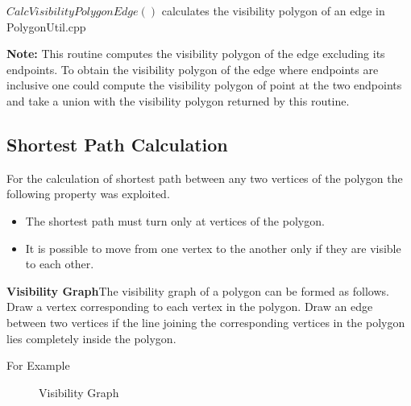  $CalcVisibilityPolygonEdge()$ calculates the visibility polygon of an edge in PolygonUtil.cpp

{\bf Note:}
This routine computes the visibility polygon of the edge excluding its endpoints. To obtain the visibility polygon of the edge where
endpoints are inclusive one could compute the visibility polygon of point at the two endpoints and take a union with the visibility
polygon returned by this routine.




\subsection{Shortest Path Calculation}
For the calculation of shortest path between any two vertices of the polygon the following property was exploited.
\begin{itemize}
 \item The shortest path must turn only at vertices of the polygon.
 \item It is possible to move from one vertex to the another only if they are visible to each other.
\end{itemize}

\begin{definition}
{\bf Visibility Graph}The visibility graph of a polygon can be formed as follows. Draw a vertex corresponding to each vertex in the 
polygon. Draw an edge between two vertices if the line joining the corresponding vertices in the polygon lies completely inside the 
polygon.
\end{definition}

For Example \\

\begin{figure}
\begin{center}
\caption{\label{fig:Construction} Visibility Graph}
\end{center}
\end{figure}

